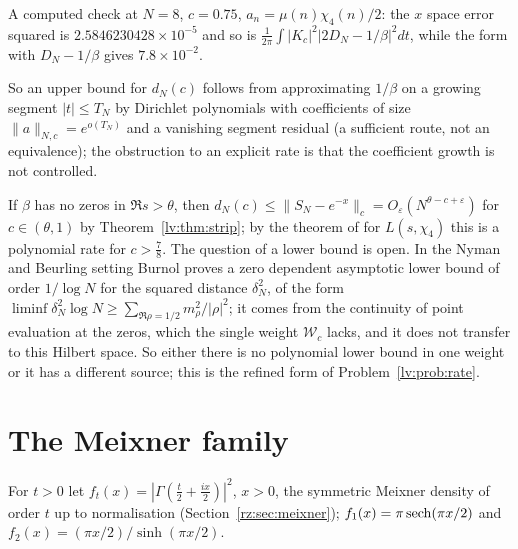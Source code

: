 A computed check at $N=8$, $c=0.75$, $a_n=\mu(n)\chi_4(n)/2$: the $x$ space error squared is $2.5846230428\times10^{-5}$ and so is $\frac1{2\pi}\int|K_c|^2|2D_N-1/\beta|^2dt$, while the form with $D_N-1/\beta$ gives $7.8\times10^{-2}$.

So an upper bound for $d_N(c)$ follows from approximating $1/\beta$ on a growing segment $|t|\le T_N$ by Dirichlet polynomials with coefficients of size $\|a\|_{N,c}=e^{o(T_N)}$ and a vanishing segment residual (a sufficient route, not an equivalence); the obstruction to an explicit rate is that the coefficient growth is not controlled.

\begin{remark}\label{lv:rem:burnol}
If $\beta$ has no zeros in $\Re s>\theta$, then $d_N(c)\le\|S_N-e^{-x}\|_c=O_\varepsilon(N^{\theta-c+\varepsilon})$ for $c\in(\theta,1)$ by Theorem~\ref{lv:thm:strip}; by the theorem of \cite{OAI26a} for $L(s,\chi_4)$ this is a polynomial rate for $c>\frac78$. The question of a lower bound is open. In the Nyman and Beurling setting Burnol \cite{Burnol02} proves a zero dependent asymptotic lower bound of order $1/\log N$ for the squared distance $\delta_N^2$, of the form $\liminf\delta_N^2\log N\ge\sum_{\Re\rho=1/2}m_\rho^2/|\rho|^2$; it comes from the continuity of point evaluation at the zeros, which the single weight $\mathcal W_c$ lacks, and it does not transfer to this Hilbert space. So either there is no polynomial lower bound in one weight or it has a different source; this is the refined form of Problem~\ref{lv:prob:rate}.
\end{remark}

\section{The Meixner family}\label{lv:sec:meixner}

For $t>0$ let $f_t(x)=|\Gamma(\frac t2+\frac{ix}2)|^2$, $x>0$, the symmetric Meixner density of order $t$ up to normalisation (Section~\ref{rz:sec:meixner}); $f_1(x)=\pi\operatorname{sech}(\pi x/2)$ and $f_2(x)=(\pi x/2)/\sinh(\pi x/2)$.

